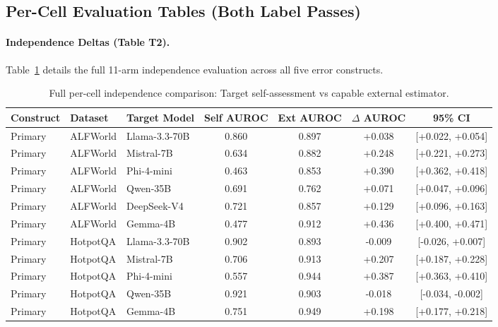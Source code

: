 \subsection{Per-Cell Evaluation Tables (Both Label Passes)}\label{app:per_cell_tables}

\paragraph{Independence Deltas (Table T2).}
Table~\ref{tab:t2_indep} details the full 11-arm independence evaluation across all five error constructs.

\begin{table}[h]\centering\small
\caption{Full per-cell independence comparison: Target self-assessment vs capable external estimator.}
\label{tab:t2_indep}
\begin{tabular}{lllcccc}
\toprule
Construct & Dataset & Target Model & Self AUROC & Ext AUROC & $\Delta$ AUROC & 95\% CI \\
\midrule
Primary & ALFWorld & Llama-3.3-70B & 0.860 & 0.897 & +0.038 & [+0.022, +0.054] \\
Primary & ALFWorld & Mistral-7B & 0.634 & 0.882 & +0.248 & [+0.221, +0.273] \\
Primary & ALFWorld & Phi-4-mini & 0.463 & 0.853 & +0.390 & [+0.362, +0.418] \\
Primary & ALFWorld & Qwen-35B & 0.691 & 0.762 & +0.071 & [+0.047, +0.096] \\
Primary & ALFWorld & DeepSeek-V4 & 0.721 & 0.857 & +0.129 & [+0.096, +0.163] \\
Primary & ALFWorld & Gemma-4B & 0.477 & 0.912 & +0.436 & [+0.400, +0.471] \\
Primary & HotpotQA & Llama-3.3-70B & 0.902 & 0.893 & -0.009 & [-0.026, +0.007] \\
Primary & HotpotQA & Mistral-7B & 0.706 & 0.913 & +0.207 & [+0.187, +0.228] \\
Primary & HotpotQA & Phi-4-mini & 0.557 & 0.944 & +0.387 & [+0.363, +0.410] \\
Primary & HotpotQA & Qwen-35B & 0.921 & 0.903 & -0.018 & [-0.034, -0.002] \\
Primary & HotpotQA & Gemma-4B & 0.751 & 0.949 & +0.198 & [+0.177, +0.218] \\
\bottomrule
\end{tabular}
\end{table}
